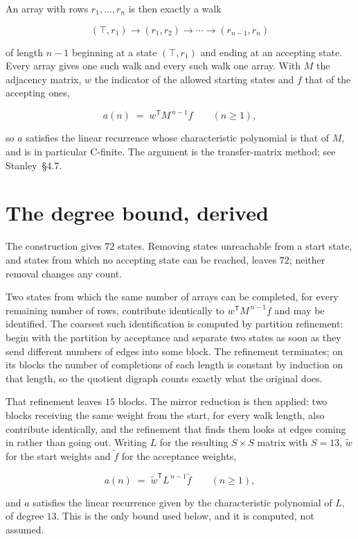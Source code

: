 \documentclass[11pt]{article}
\theoremstyle{definition}
\begin{document}
An array with rows $r_1,\dots,r_n$ is then exactly a walk

\[(\top,r_1) \to (r_1,r_2) \to \cdots \to (r_{n-1},r_n)\]

of length $n-1$ beginning at a state $(\top,r_1)$ and ending at an accepting state. Every array gives one such walk and every such walk one array. With $M$ the adjacency matrix, $w$ the indicator of the allowed starting states and $f$ that of the accepting ones,

\[a(n) \;=\; w^{\mathsf T} M^{\,n-1} f \qquad (n \ge 1),\]

so $a$ satisfies the linear recurrence whose characteristic polynomial is that of $M$, and is in particular C-finite. The argument is the transfer-matrix method; see Stanley~\S4.7.

\section{The degree bound, derived}

The construction gives $72$ states. Removing states unreachable from a start state, and states from which no accepting state can be reached, leaves $72$; neither removal changes any count.

Two states from which the same number of arrays can be completed, for every remaining number of rows, contribute identically to $w^{\mathsf T}M^{\,n-1}f$ and may be identified. The coarsest such identification is computed by partition refinement: begin with the partition by acceptance and separate two states as soon as they send different numbers of edges into some block. The refinement terminates; on its blocks the number of completions of each length is constant by induction on that length, so the quotient digraph counts exactly what the original does.

That refinement leaves $15$ blocks. The mirror reduction is then applied: two blocks receiving the same weight from the start, for every walk length, also contribute identically, and the refinement that finds them looks at edges coming in rather than going out. Writing $L$ for the resulting $S \times S$ matrix with $S = 13$, $\tilde w$ for the start weights and $\tilde f$ for the acceptance weights,

\[a(n) \;=\; \tilde w^{\mathsf T} L^{\,n-1} \tilde f \qquad (n \ge 1),\]

and $a$ satisfies the linear recurrence given by the characteristic polynomial of $L$, of degree $13$. This is the only bound used below, and it is computed, not assumed.
\end{document}
